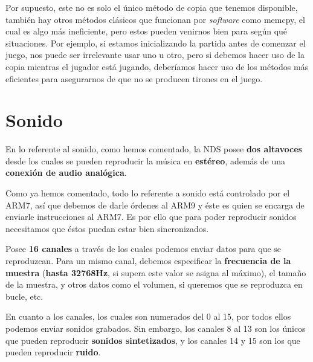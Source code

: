 \vspace{0.5cm}

Por supuesto, este no es solo el único método de copia que tenemos disponible, también hay otros métodos clásicos que funcionan por \textit{software} como memcpy, el cual es algo más ineficiente, pero estos pueden venirnos bien para según qué situaciones. Por ejemplo, si estamos inicializando la partida antes de comenzar el juego, nos puede ser irrelevante usar uno u otro, pero si debemos hacer uso de la copia mientras el jugador está jugando, deberíamos hacer uso de los métodos más eficientes para asegurarnos de que no se producen tirones en el juego.

\vspace{1cm}

\section{Sonido}

En lo referente al sonido, como hemos comentado, la NDS posee \textbf{dos altavoces} desde los cuales se pueden reproducir la música en \textbf{estéreo}, además de una \textbf{conexión de audio analógica}.

\vspace{0.5cm}

Como ya hemos comentado, todo lo referente a sonido está controlado por el ARM7, así que debemos de darle órdenes al ARM9 y éste es quien se encarga de enviarle instrucciones al ARM7. Es por ello que para poder reproducir sonidos necesitamos que éstos puedan estar bien sincronizados.

\vspace{0.5cm}

Posee \textbf{16 canales} a través de los cuales podemos enviar datos para que se reproduzcan. Para un mismo canal, debemos especificar la \textbf{frecuencia de la muestra} (\textbf{hasta 32768Hz}, si supera este valor se asigna al máximo), el tamaño de la muestra, y otros datos como el volumen, si queremos que se reproduzca en bucle, etc.

\vspace{0.5cm}

En cuanto a los canales, los cuales son numerados del 0 al 15, por todos ellos podemos enviar sonidos grabados. Sin embargo, los canales 8 al 13 son los únicos que pueden reproducir \textbf{sonidos sintetizados}, y los canales 14 y 15 son los que pueden reproducir \textbf{ruido}.

\vspace{0.5cm}

